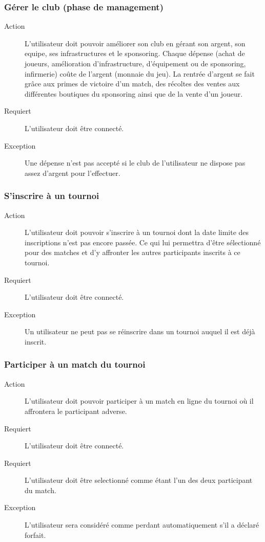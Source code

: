 \documentclass[a4paper]{article}
\begin{document}
\subsubsection{Gérer le \gls{club} (phase de management)}
\begin{description}
\item[Action] L'\gls{utilisateur} doit pouvoir améliorer son \gls{club} en gérant son argent, son \gls{equipe}, ses infrastructures et le sponsoring. Chaque dépense (achat de \glspl{joueur}, amélioration d'infrastructure, d'équipement ou de sponsoring, infirmerie) coûte de l'argent (monnaie du jeu). La rentrée d'argent se fait grâce aux primes de victoire d'un match, des récoltes des ventes aux différentes boutiques du sponsoring ainsi que de la vente d'un \gls{joueur}.
\item[Requiert] L'\gls{utilisateur} doit être connecté.
\item[Exception] Une dépense n'est pas accepté si le \gls{club} de l'\gls{utilisateur} ne dispose pas assez d'argent pour l'effectuer.
\end{description}

\subsubsection{S'inscrire à un tournoi}
\begin{description}
\item[Action] L'\gls{utilisateur} doit pouvoir s'inscrire à un tournoi dont la date limite des inscriptions n'est pas encore passée.
Ce qui lui permettra d'être sélectionné pour des matches et d'y affronter les autres participants inscrits à ce tournoi.
\item[Requiert] L'\gls{utilisateur} doit être connecté.
\item[Exception] Un \gls{utilisateur} ne peut pas se réinscrire dans un tournoi auquel il est déjà inscrit.
\end{description} 

\subsubsection{Participer à un match du tournoi}
\begin{description}
\item[Action] L'\gls{utilisateur} doit pouvoir participer à un match en ligne du tournoi où il affrontera le participant adverse.
\item[Requiert] L'\gls{utilisateur} doit être connecté.
\item[Requiert] L'\gls{utilisateur} doit être selectionné comme étant l'un des deux participant du match.
\item[Exception] L'\gls{utilisateur} sera considéré comme perdant automatiquement s'il a déclaré forfait.
\end{description}
\end{document}
